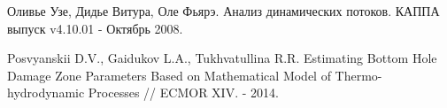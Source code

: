 \begin{thebibliography}{99}
 Оливье Узе, Дидье Витура, Оле Фьярэ. Анализ динамических потоков. КАППА выпуск v4.10.01 - Октябрь 2008.

 Posvyanskii D.V., Gaidukov L.A., Tukhvatullina R.R. Estimating Bottom Hole Damage Zone Parameters Based on Mathematical Model of Thermo-hydrodynamic Processes // ECMOR XIV. - 2014.

\end{thebibliography}
	
